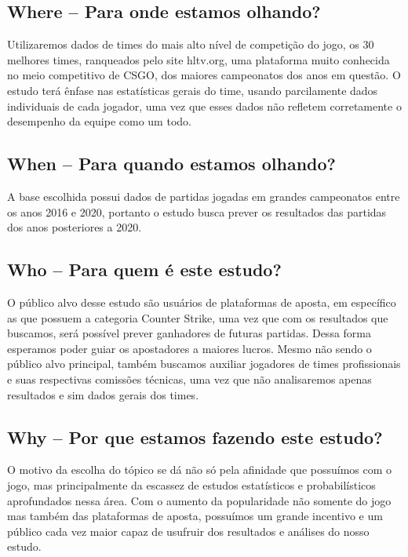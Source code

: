 \documentclass[a4paper,times,12pt]{article}
\begin{document}
\subsection*{Where – Para onde estamos olhando?}
\hspace{+15pt}
Utilizaremos dados de times do mais alto nível de competição do jogo, os 30 melhores times, ranqueados pelo site hltv.org, uma plataforma muito conhecida no meio competitivo de CSGO, dos maiores campeonatos dos anos em questão. 
O estudo terá ênfase nas estatísticas gerais do time, usando parcilamente dados individuais de cada jogador, uma vez que esses dados não refletem corretamente o desempenho da equipe como um todo.

\subsection*{When – Para quando estamos olhando?}
\hspace{+15pt}
A base escolhida possui dados de partidas jogadas em grandes campeonatos entre os anos 2016 e 2020, portanto o estudo busca prever os resultados das partidas dos anos posteriores a 2020.

\subsection*{Who – Para quem é este estudo?}
\hspace{+15pt}
O público alvo desse estudo são usuários de plataformas de aposta, em específico as que possuem a categoria Counter Strike, uma vez que com os resultados que buscamos, será possível prever ganhadores de futuras partidas. Dessa forma esperamos poder guiar os apostadores a maiores lucros.
Mesmo não sendo o público alvo principal, também buscamos auxiliar jogadores de times profissionais e suas respectivas comissões técnicas, uma vez que não analisaremos apenas resultados e sim dados gerais dos times.

\subsection*{Why – Por que estamos fazendo este estudo?}
\hspace{+15pt}
O motivo da escolha do tópico se dá não só pela afinidade que possuímos com o jogo, mas principalmente da escassez de estudos estatísticos e probabilísticos aprofundados nessa área. 
Com o aumento da popularidade não somente do jogo mas também das plataformas de aposta, possuímos um grande incentivo e um público cada vez maior capaz de usufruir dos resultados e análises do nosso estudo.
\end{document}
